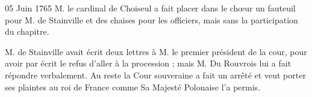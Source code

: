 \begin{diary}{05 Juin 1765}{}
                           M. le cardinal de Choiseul a fait
                           placer dans le
                           chœur un fauteuil pour M. de
                              Stainville et des
                           chaises pour les officiers, mais sans la participation
                           du chapitre. \bigskip





                           M. de Stainville avait écrit
                           deux lettres à M.
                              le premier président de la cour, pour avoir par écrit
                           le refus d'aller à la procession ; mais M.
                              Du Rouvrois
                           lui a fait répondre verbalement. Au reste la
                              Cour souveraine a fait un arrêté et veut porter ses
                           plaintes au roi de France comme Sa Majesté Polonaise l'a permis. \bigskip


                     \end{diary}

